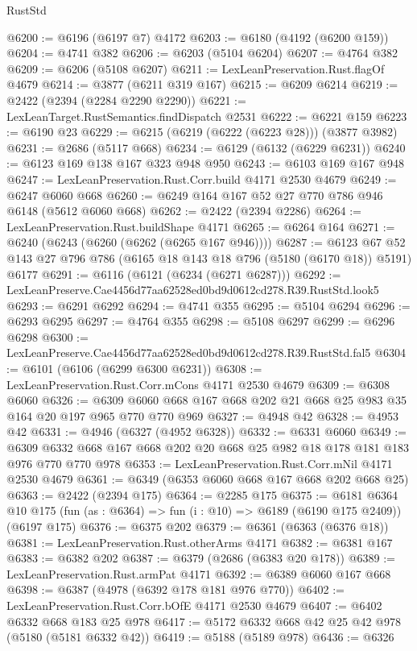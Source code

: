 \begin{lexlean}{RustStd}
\begin{coremodule}
@6200 := @6196 (@6197 @7) @4172
@6203 := @6180 (@4192 (@6200 @159))
@6204 := @4741 @382
@6206 := @6203 (@5104 @6204)
@6207 := @4764 @382
@6209 := @6206 (@5108 @6207)
@6211 := LexLeanPreservation.Rust.flagOf @4679
@6214 := @3877 (@6211 @319 @167)
@6215 := @6209 @6214
@6219 := @2422 (@2394 (@2284 @2290 @2290))
@6221 := LexLeanTarget.RustSemantics.findDispatch @2531
@6222 := @6221 @159
@6223 := @6190 @23
@6229 := @6215 (@6219 (@6222 (@6223 @28))) (@3877 @3982)
@6231 := @2686 (@5117 @668)
@6234 := @6129 (@6132 (@6229 @6231))
@6240 := @6123 @169 @138 @167 @323 @948 @950
@6243 := @6103 @169 @167 @948
@6247 := LexLeanPreservation.Rust.Corr.build @4171 @2530 @4679
@6249 := @6247 @6060 @668
@6260 := @6249 @164 @167 @52 @27 @770 @786 @946 @6148 (@5612 @6060 @668)
@6262 := @2422 (@2394 @2286)
@6264 := LexLeanPreservation.Rust.buildShape @4171
@6265 := @6264 @164
@6271 := @6240 (@6243 (@6260 (@6262 (@6265 @167 @946))))
@6287 := @6123 @67 @52 @143 @27 @796 @786 (@6165 @18 @143 @18 @796 (@5180 (@6170 @18)) @5191) @6177
@6291 := @6116 (@6121 (@6234 (@6271 @6287)))
@6292 := LexLeanPreserve.Cae4456d77aa62528ed0bd9d0612cd278.R39.RustStd.look5
@6293 := @6291 @6292
@6294 := @4741 @355
@6295 := @5104 @6294
@6296 := @6293 @6295
@6297 := @4764 @355
@6298 := @5108 @6297
@6299 := @6296 @6298
@6300 := LexLeanPreserve.Cae4456d77aa62528ed0bd9d0612cd278.R39.RustStd.fal5
@6304 := @6101 (@6106 (@6299 @6300 @6231))
@6308 := LexLeanPreservation.Rust.Corr.mCons @4171 @2530 @4679
@6309 := @6308 @6060
@6326 := @6309 @6060 @668 @167 @668 @202 @21 @668 @25 @983 @35 @164 @20 @197 @965 @770 @770 @969
@6327 := @4948 @42
@6328 := @4953 @42
@6331 := @4946 (@6327 (@4952 @6328))
@6332 := @6331 @6060
@6349 := @6309 @6332 @668 @167 @668 @202 @20 @668 @25 @982 @18 @178 @181 @183 @976 @770 @770 @978
@6353 := LexLeanPreservation.Rust.Corr.mNil @4171 @2530 @4679
@6361 := @6349 (@6353 @6060 @668 @167 @668 @202 @668 @25)
@6363 := @2422 (@2394 @175)
@6364 := @2285 @175
@6375 := @6181
    @6364
    @10
    @175
    (fun (as : @6364) => fun (i : @10) => @6189 (@6190 @175 @2409))
    (@6197 @175)
@6376 := @6375 @202
@6379 := @6361 (@6363 (@6376 @18))
@6381 := LexLeanPreservation.Rust.otherArms @4171
@6382 := @6381 @167
@6383 := @6382 @202
@6387 := @6379 (@2686 (@6383 @20 @178))
@6389 := LexLeanPreservation.Rust.armPat @4171
@6392 := @6389 @6060 @167 @668
@6398 := @6387 (@4978 (@6392 @178 @181 @976 @770))
@6402 := LexLeanPreservation.Rust.Corr.bOfE @4171 @2530 @4679
@6407 := @6402 @6332 @668 @183 @25 @978
@6417 := @5172 @6332 @668 @42 @25 @42 @978 (@5180 (@5181 @6332 @42))
@6419 := @5188 (@5189 @978)
@6436 := @6326

\end{coremodule}
\end{lexlean}
